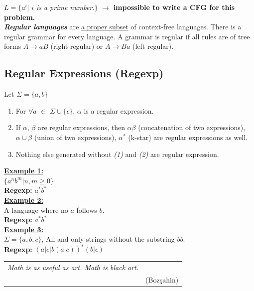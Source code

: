 \documentclass[12pt,a4paper]{article}
\begin{document}
{$L=\lbrace a^{i}|$ $i$ \emph{is a prime number.}$\rbrace$ $\longrightarrow$ \textbf{impossible to write a CFG for this problem.}\\

\emph{\textbf{Regular languages}} are \underline{a proper subset} of context-free languages. There is a regular grammar for every language. A grammar is regular if all rules are of tree forms $A\rightarrow aB$ (right regular) or $A\rightarrow Ba$ (left regular).

\subsection{Regular Expressions (Regexp)}
Let $\Sigma=\lbrace a,b\rbrace$
\begin{enumerate}
\item For $\forall a$ $\in$ $\Sigma \cup\lbrace\epsilon\rbrace$, $\alpha$ is a regular expression.
\item If $\alpha$, $\beta$ are regular expressions, then $\alpha\beta$ (concatenation of two expressions), $\alpha\cup\beta$ (union of two expressions), $\alpha^{*}$ (k-star) are regular expressions as well.
\item Nothing else generated without \emph{(1)} and \emph{(2)} are regular expression. 
\end{enumerate}

\noindent \underline{\textbf{Example 1:}}\\
$\lbrace a^{n}b^{m}|n,m\geq 0\rbrace$\\
\textbf{Regexp:} $a^{*}b^{*}$\\

\noindent \underline{\textbf{Example 2:}}\\
A language where no $a$ follows $b$.\\
\textbf{Regexp:} $a^{*}b^{*}$\\

\noindent \underline{\textbf{Example 3:}}\\
$\Sigma=\lbrace a,b,c\rbrace$, All and only strings without the substring $bb$.\\
\textbf{Regexp:} $(a|c|b(a|c))^{*}(b|\epsilon)$

\begin{table}[H]
\centering
\begin{tabular}{cc}
\hline 
\emph{Math is as useful as art. Math is black art.} &\\ 
& (Bozşahin) \\ 
\hline 
\end{tabular} 
\end{table}

}
\end{document}
